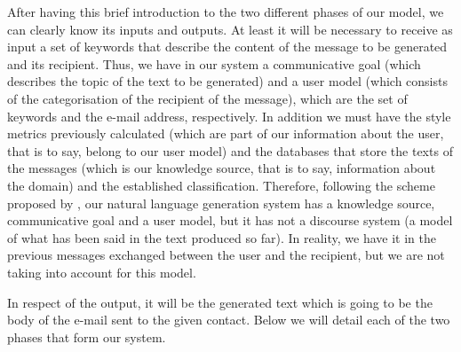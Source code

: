 After having this brief introduction to the two different phases of our model, we can clearly know its inputs and outputs. At least it will be necessary to receive as input a set of keywords that describe the content of the message to be generated and its recipient. Thus, we have in our system a communicative goal (which describes the topic of the text to be generated) and a user model (which consists of the categorisation of the recipient of the message), which are the set of keywords and the e-mail address, respectively. In addition we must have the style metrics previously calculated (which are part of our information about the user, that is to say, belong to our user model) and the databases that store the texts of the messages (which is our knowledge source, that is to say, information about the domain) and the established classification. Therefore, following the scheme proposed by \cite{reiter2000building}, our natural language generation system has a knowledge source, communicative goal and a user model, but it has not a discourse system (a model of what has been said in the text produced so far). In reality, we have it in the previous messages exchanged between the user and the recipient, but we are not taking into account for this model.

In respect of the output, it will be the generated text which is going to be the body of the e-mail sent to the given contact. Below we will detail each of the two phases that form our system.